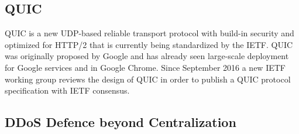 \subsection{QUIC}

QUIC \cite{draft-ietf-quic-transport} is a new UDP-based reliable transport
protocol with build-in security and optimized for HTTP/2 \cite{rfc7540} that
is currently being standardized by the \ac{IETF}. QUIC was originally proposed
by Google and has already seen large-scale deployment for Google services and
in Google Chrome.  Since September 2016 a new IETF working group reviews the
design of QUIC in order to publish a QUIC protocol specification
\cite{draft-ietf-quic-transport} with IETF consensus.




\subsection{DDoS Defence beyond Centralization}

